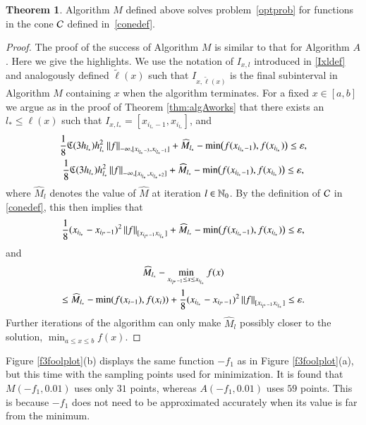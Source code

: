 \documentclass[review]{elsarticle}
\newcommand{\abstol}{\varepsilon}
\theoremstyle{definition}
\newcommand{\tell}{\tilde{\ell}}
\newcommand{\hM}{\widehat{M}}
\newtheorem{theorem}{Theorem}
\newcommand{\minfii}{\min(f(x_{i-1}), f(x_i))} %
\begin{document}
\begin{theorem} \label{thm:algMworks}
Algorithm $M$ defined above solves problem~\eqref{optprob} for functions in the
cone $\mathcal{C}$ defined in~\eqref{conedef}.
\end{theorem}

\begin{proof}
	The proof of the success of Algorithm $M$ is similar to that for Algorithm $A$. Here we give the highlights.     We use the notation of $I_{x,l}$ introduced in \eqref{Ixldef} and analogously defined $\tell(x)$ such that $I_{x,\tell(x)}$ is the final subinterval in Algorithm $M$ containing $x$ when the algorithm terminates.   For a fixed $x \in [a,b]$ we argue as in the proof of Theorem \ref{thm:algAworks} that there exists an $l_{*} \le \ell(x)$ such that $I_{x,l_*} =[x_{i_{l_*}-1},x_{i_{l_*}}]$, and
	\begin{gather*}
	\frac{1} 8 \fC(3h_{l_*}) h_{l_*}^2 \norm[-\infty,{[x_{i_{l_*}-3},x_{i_{l_*}-1}]}]{f} + \hM_{l_*} -  \min\bigl(f(x_{i_{l_*}-1}),f(x_{i_{l_*}})\bigr)   \le \abstol , \\
	\frac{1} 8 \fC(3h_{l_*}) h_{l_*}^2 \norm[-\infty,{[x_{i_{l_*}},x_{i_{l_*}+2}]}]{f} +  \hM_{l_*} -  \min\bigl(f(x_{i_{l_*}-1}),f(x_{i_{l_*}})\bigr)   \le \abstol,
	\end{gather*}
	where $ \hM_{l}$ denotes the value of $\hM$ at iteration $l \in \mathbb{N}_{0}$.  By the definition of $\mathcal{C}$ in \eqref{conedef}, this then implies that
	\[
	\frac{1}{8} (x_{i_{l_*}} - x_{i_{l^*}-1})^2\norm[{[x_{i_{l^*}-1} x_{i_{l_*}}]}]{f} + \hM_{l_*} -  \min\bigl(f(x_{i_{l_*}-1}),f(x_{i_{l_*}})\bigr)   \le \abstol,
	\]
	and
		\begin{multline*}
		\hM_{l_*} - \min_{x_{i_{l^*}-1} \le x \le x_{i_{l_*}}} f(x) \\
		\le \hM_{l_*}  - \minfii + \frac{1}{8} (x_{i_{l_*}} - x_{i_{l^*}-1})^2\norm[{[x_{i_{l^*}-1} x_{i_{l_*}}]}]{f} \le  \abstol.
		\end{multline*}
Further iterations of the algorithm can only make $\hM_{l}$ possibly closer to the solution, $\min_{a \le x \le b} f(x) $.
\end{proof}

Figure \ref{f3foolplot}(b) displays the same function $-f_1$ as in
Figure \ref{f3foolplot}(a), but this time with the sampling points used for
minimization. It is found that $M(-f_1,0.01)$ uses only $31$ points, whereas
$A(-f_1,0.01)$ uses $59$ points. This is because $-f_1$ does not need to be
approximated accurately when its value is far from the minimum.
\end{document}
